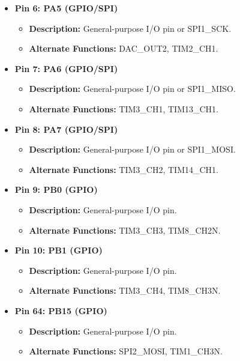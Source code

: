 \documentclass{article}
\begin{document}
\begin{itemize}
    \item \textbf{Pin 6: PA5 (GPIO/SPI)} 
    \begin{itemize}
        \item \textbf{Description:} General-purpose I/O pin or SPI1\_SCK.
        \item \textbf{Alternate Functions:} DAC\_OUT2, TIM2\_CH1.
    \end{itemize}
    
    \item \textbf{Pin 7: PA6 (GPIO/SPI)} 
    \begin{itemize}
        \item \textbf{Description:} General-purpose I/O pin or SPI1\_MISO.
        \item \textbf{Alternate Functions:} TIM3\_CH1, TIM13\_CH1.
    \end{itemize}
    
    \item \textbf{Pin 8: PA7 (GPIO/SPI)} 
    \begin{itemize}
        \item \textbf{Description:} General-purpose I/O pin or SPI1\_MOSI.
        \item \textbf{Alternate Functions:} TIM3\_CH2, TIM14\_CH1.
    \end{itemize}
    
    \item \textbf{Pin 9: PB0 (GPIO)} 
    \begin{itemize}
        \item \textbf{Description:} General-purpose I/O pin.
        \item \textbf{Alternate Functions:} TIM3\_CH3, TIM8\_CH2N.
    \end{itemize}
    
    \item \textbf{Pin 10: PB1 (GPIO)} 
    \begin{itemize}
        \item \textbf{Description:} General-purpose I/O pin.
        \item \textbf{Alternate Functions:} TIM3\_CH4, TIM8\_CH3N.
    \end{itemize}


    \item \textbf{Pin 64: PB15 (GPIO)} 
    \begin{itemize}
        \item \textbf{Description:} General-purpose I/O pin.
        \item \textbf{Alternate Functions:} SPI2\_MOSI, TIM1\_CH3N.
    \end{itemize}

\end{itemize}
\end{document}
